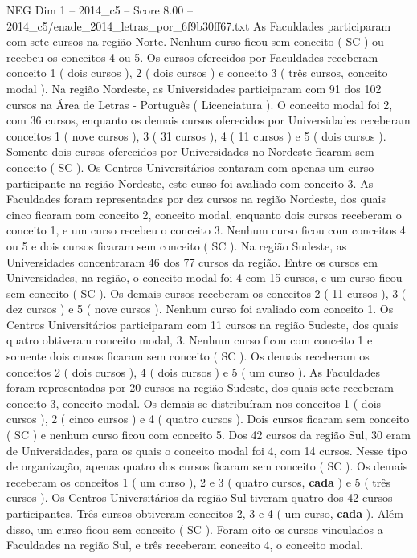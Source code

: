 \begin{textsample}{NEG Dim 1 – 2014\_c5 – Score 8.00 – 2014\_c5/enade\_2014\_letras\_por\_6f9b30ff67.txt}
As Faculdades participaram com sete cursos na região Norte.
Nenhum curso ficou sem conceito ( SC ) ou recebeu os conceitos 4 ou 5.
Os cursos oferecidos por Faculdades receberam conceito 1 ( dois cursos ), 2 ( dois cursos ) e conceito 3 ( três cursos, conceito modal ).
Na região Nordeste, as Universidades participaram com 91 dos 102 cursos na Área de Letras - Português ( Licenciatura ).
O conceito modal foi 2, com 36 cursos, enquanto os demais cursos oferecidos por Universidades receberam conceitos 1 ( nove cursos ), 3 ( 31 cursos ), 4 ( 11 cursos ) e 5 ( dois cursos ).
Somente dois cursos oferecidos por Universidades no Nordeste ficaram sem conceito ( SC ).
Os Centros Universitários contaram com apenas um curso participante na região Nordeste, este curso foi avaliado com conceito 3.
As Faculdades foram representadas por dez cursos na região Nordeste, dos quais cinco ficaram com conceito 2, conceito modal, enquanto dois cursos receberam o conceito 1, e um curso recebeu o conceito 3.
Nenhum curso ficou com conceitos 4 ou 5 e dois cursos ficaram sem conceito ( SC ).
Na região Sudeste, as Universidades concentraram 46 dos 77 cursos da região.
Entre os cursos em Universidades, na região, o conceito modal foi 4 com 15 cursos, e um curso ficou sem conceito ( SC ).
Os demais cursos receberam os conceitos 2 ( 11 cursos ), 3 ( dez cursos ) e 5 ( nove cursos ).
Nenhum curso foi avaliado com conceito 1.
Os Centros Universitários participaram com 11 cursos na região Sudeste, dos quais quatro obtiveram conceito modal, 3.
Nenhum curso ficou com conceito 1 e somente dois cursos ficaram sem conceito ( SC ).
Os demais receberam os conceitos 2 ( dois cursos ), 4 ( dois cursos ) e 5 ( um curso ).
As Faculdades foram representadas por 20 cursos na região Sudeste, dos quais sete receberam conceito 3, conceito modal.
Os demais se distribuíram nos conceitos 1 ( dois cursos ), 2 ( cinco cursos ) e 4 ( quatro cursos ).
Dois cursos ficaram sem conceito ( SC ) e nenhum curso ficou com conceito 5.
Dos 42 cursos da região Sul, 30 eram de Universidades, para os quais o conceito modal foi 4, com 14 cursos.
Nesse tipo de organização, apenas quatro dos cursos ficaram sem conceito ( SC ).
Os demais receberam os conceitos 1 ( um curso ), 2 e 3 ( quatro cursos, \textbf{cada} ) e 5 ( três cursos ).
Os Centros Universitários da região Sul tiveram quatro dos 42 cursos participantes.
Três cursos obtiveram conceitos 2, 3 e 4 ( um curso, \textbf{cada} ).
Além disso, um curso ficou sem conceito ( SC ).
Foram oito os cursos vinculados a Faculdades na região Sul, e três receberam conceito 4, o conceito modal.

\end{textsample}
